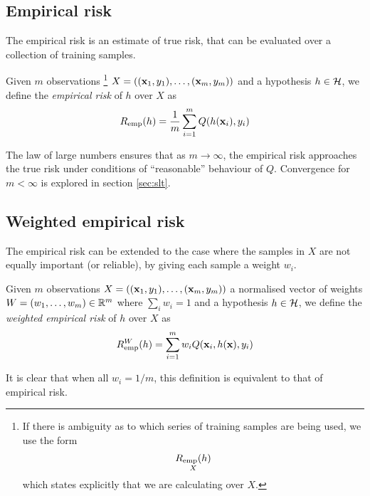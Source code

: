 \subsection{Empirical risk}
\label{sec:empirical risk}
The empirical risk is an estimate of true risk, that can be evaluated
over a collection of training samples.

\begin{definition}
Given $m$ observations
\footnote{If there is ambiguity as to which series of training samples
are being used, we use the form
%
\begin{equation*}
\underset{X}{R_{\mathrm{emp}}(h)}
\end{equation*}
%
which states explicitly that we are calculating over $X$.}
$X = ((\mathbf{x}_1, y_1), \ldots, (\mathbf{x}_m, y_m))$ and a hypothesis $h \in
\mathcal{H}$, we define the \emph{empirical risk} of $h$ over $X$ as 
%
\begin{equation}
R_{\mathrm{emp}}(h) = \frac{1}{m} \sum_{i=1}^{m} Q(h(\mathbf{x}_i), y_i)
\end{equation}
\end{definition}

The law of large numbers ensures that as $m \rightarrow \infty$, the
empirical risk approaches the true risk under conditions of
``reasonable'' behaviour of $Q$.  Convergence for $m < \infty$  is
explored in section \ref{sec:slt}.

\subsection{Weighted empirical risk}
\label{sec:weighted empirical risk}

The empirical risk can be extended to the case where the samples in
$X$ are not equally important (or reliable), by giving each sample a
weight $w_i$.

\begin{definition}
Given $m$ observations $X = ((\mathbf{x}_1, y_1), \ldots, (\mathbf{x}_m,
y_m))$ a normalised vector of weights $W = (w_1, \ldots, w_m) \in
\mathbb{R}^m$ where $\sum_{i} w_i = 1$ and a hypothesis $h \in
\mathcal{H}$, we define the \emph{weighted empirical risk} of $h$ over $X$ as 
%
\begin{equation}
R_{\mathrm{emp}}^W(h) = \sum_{i=1}^{m} w_i Q(\mathbf{x}_i, h(\mathbf{x}), y_i)
\end{equation}
\end{definition}
%
It is clear that when all $w_i = 1/m$, this definition is equivalent
to that of empirical risk.

